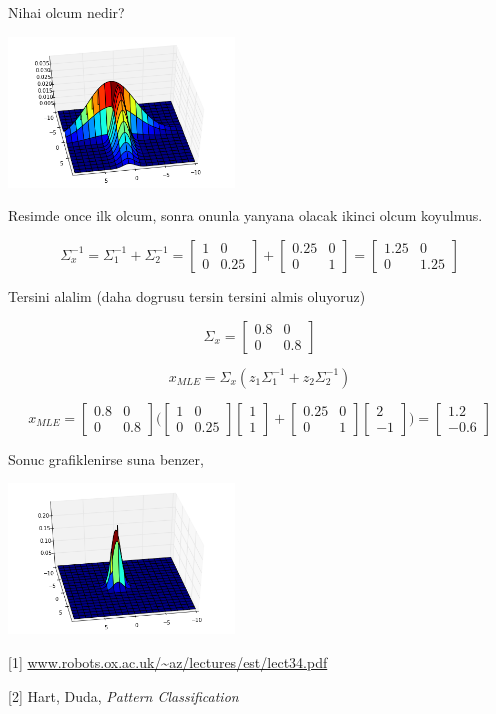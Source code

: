 \documentclass[12pt,fleqn]{article}\usepackage{../common}
\begin{document}
Nihai olcum nedir? 

\includegraphics[height=4cm]{fusion_1.png}

Resimde once ilk olcum, sonra onunla yanyana olacak ikinci olcum koyulmus. 

$$ \Sigma_x^{-1} = \Sigma_1^{-1} + \Sigma_2^{-1}  =
\left[\begin{array}{cc}
1 & 0 \\ 0 & 0.25
\end{array}\right] + 
\left[\begin{array}{cc}
0.25 & 0 \\ 0 & 1
\end{array}\right] =
\left[\begin{array}{cc}
1.25 & 0 \\ 0 & 1.25
\end{array}\right] 
$$

Tersini alalim (daha dogrusu tersin tersini almis oluyoruz)

$$ \Sigma_x =
\left[\begin{array}{cc}
0.8 & 0 \\ 0 & 0.8
\end{array}\right] 
$$

$$ x_{MLE} =  \Sigma_x (z_1\Sigma_1^{-1}  + z_2\Sigma_2^{-1}) $$

$$ 
x_{MLE} =
\left[\begin{array}{cc}
0.8 & 0 \\ 0 & 0.8
\end{array}\right] 
\bigg(
\left[\begin{array}{cc}
1 & 0 \\ 0 & 0.25
\end{array}\right] 
\left[\begin{array}{c}
1 \\ 1
\end{array}\right]  + 
\left[\begin{array}{cc}
0.25 & 0 \\ 0 & 1
\end{array}\right] 
\left[\begin{array}{r}
2 \\ -1
\end{array}\right]  
\bigg) = 
\left[\begin{array}{r}
1.2 \\ -0.6
\end{array}\right]  
$$

Sonuc grafiklenirse suna benzer,

\includegraphics[height=4cm]{fusion_2.png}

[1] \url{www.robots.ox.ac.uk/~az/lectures/est/lect34.pdf}

[2] Hart, Duda, {\em Pattern Classification}
\end{document}
